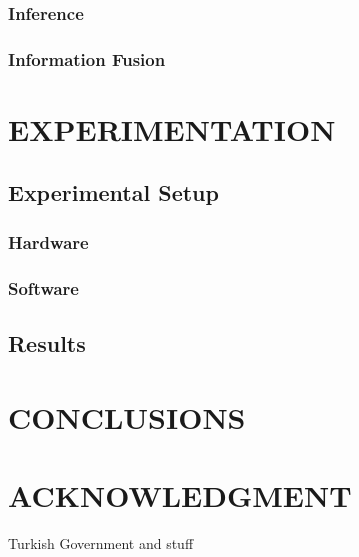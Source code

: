 \documentclass[letterpaper, 10 pt, conference]{ieeeconf}  %
\newcommand{\lorem}{
}
\begin{document}
    \subsubsection{Inference}

    \subsubsection{Information Fusion}
    \lorem{}

\section{\label{sec-EX}EXPERIMENTATION}
  \subsection{Experimental Setup}
    \subsubsection{Hardware}
    \subsubsection{Software}
  \subsection{Results}
  \lorem{} 
  \lorem{}

\section{\label{sec-CO}CONCLUSIONS}
  \lorem{}

\addtolength{\textheight}{-12cm}   %


\section*{ACKNOWLEDGMENT}
Turkish Government and stuff



\end{document}
